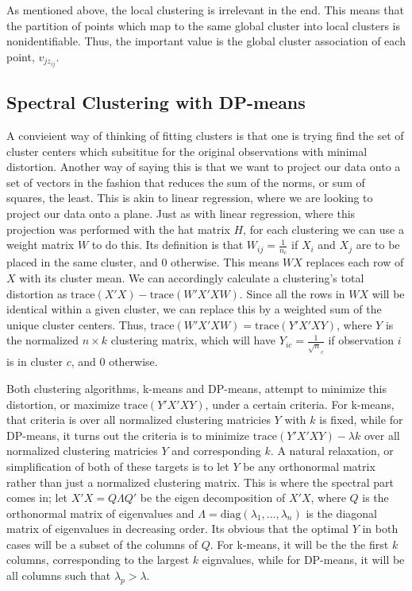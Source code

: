 \documentclass[11pt]{article}
\newcommand{\trace}{\mathrm{trace}}
\newcommand{\diag}{\mathrm{diag}}
\theoremstyle{definition}
\begin{document}
As mentioned above, the local clustering is irrelevant in the end. This means that the partition of points which map to the same global cluster into local clusters is nonidentifiable. Thus, the important value is the global cluster association of each point, $v_{jz_{ij}}$.

\subsection{Spectral Clustering with DP-means}
A convieient way of thinking of fitting clusters is that one is trying find the set of cluster centers which subsititue for the original observations with minimal distortion. Another way of saying this is that we want to project our data onto a set of vectors in the fashion that reduces the sum of the norms, or sum of squares, the least. This is akin to linear regression, where we are looking to project our data onto a plane. Just as with linear regression, where this projection was performed with the hat matrix $H$, for each clustering we can use a weight matrix $W$ to do this. Its definition is that $W_{ij}=\frac{1}{n_c}$ if $X_i$ and $X_j$ are to be placed in the same cluster, and $0$ otherwise. This means $WX$ replaces each row of $X$ with its cluster mean. We can accordingly calculate a clustering's total distortion as $\trace(X'X)-\trace(W'X'XW)$. Since all the rows in $WX$ will be identical within a given cluster, we can replace this by a weighted sum of the unique cluster centers. Thus, $\trace(W'X'XW)=\trace(Y'X'XY)$, where $Y$ is the normalized $n\times k$ clustering matrix, which will have $Y_{ic}=\frac{1}{\sqrt n_c}$ if observation $i$ is in cluster $c$, and 0 otherwise. \par
Both clustering algorithms, k-means and DP-means, attempt to minimize this distortion, or maximize $\trace(Y'X'XY)$, under a certain criteria. For k-means, that criteria is over all normalized clustering matricies $Y$ with $k$ is fixed, while for DP-means, it turns out the criteria is to minimize $\trace(Y'X'XY)-\lambda k$ over all normalized clustering matricies $Y$ and corresponding $k$. A natural relaxation, or simplification of both of these targets is to let $Y$ be any orthonormal matrix rather than just a normalized clustering matrix. This is where the spectral part comes in; let $X'X=Q\Lambda Q'$ be the eigen decomposition of $X'X$, where $Q$ is the orthonormal matrix of eigenvalues and $\Lambda=\diag(\lambda_1,...,\lambda_n)$ is the diagonal matrix of eigenvalues in decreasing order. Its obvious that the optimal $Y$ in both cases will be a subset of the columns of $Q$. For k-means, it will be the the first $k$ columns, corresponding to the largest $k$ eignvalues, while for DP-means, it will be all columns such that $\lambda_p>\lambda$. \par
\end{document}
